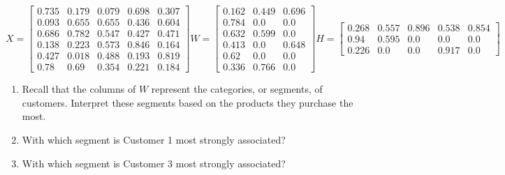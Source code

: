 \documentclass[10pt]{article}
\begin{document}
\begin{enumerate}
\begin{equation*}
X = \begin{bmatrix}
0.735 & 0.179 & 0.079 & 0.698 & 0.307 \\
0.093 & 0.655 & 0.655 & 0.436 & 0.604 \\
0.686 & 0.782 & 0.547 & 0.427 & 0.471 \\
0.138 & 0.223 & 0.573 & 0.846 & 0.164 \\
0.427 & 0.018 & 0.488 & 0.193 & 0.819 \\
0.78 & 0.69 & 0.354 & 0.221 & 0.184
\end{bmatrix}
W = \begin{bmatrix}
0.162 & 0.449 & 0.696 \\
0.784 & 0.0 & 0.0 \\
0.632 & 0.599 & 0.0 \\
0.413 & 0.0 & 0.648 \\
0.62 & 0.0 & 0.0 \\
0.336 & 0.766 & 0.0
\end{bmatrix}
H = \begin{bmatrix}
0.268 & 0.557 & 0.896 & 0.538 & 0.854 \\
0.94 & 0.595 & 0.0 & 0.0 & 0.0 \\
0.226 & 0.0 & 0.0 & 0.917 & 0.0
\end{bmatrix}
\label{eq:NMF_Matrices}
\end{equation*}

\begin{enumerate}
\item Recall that the columns of $W$ represent the categories, or segments, of customers. Interpret these segments based on the products they purchase the most. \\

\item With which segment is Customer 1 most strongly associated? \\

\item With which segment is Customer 3 most strongly associated? \\

\end{enumerate}


\end{enumerate}
\end{document}
